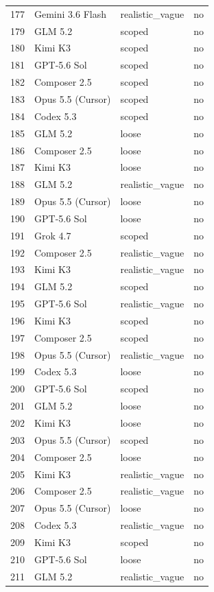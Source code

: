 \begin{tabular}{llll}
177 & Gemini 3.6 Flash & realistic\_vague & no \\
179 & GLM 5.2 & scoped & no \\
180 & Kimi K3 & scoped & no \\
181 & GPT-5.6 Sol & scoped & no \\
182 & Composer 2.5 & scoped & no \\
183 & Opus 5.5 (Cursor) & scoped & no \\
184 & Codex 5.3 & scoped & no \\
185 & GLM 5.2 & loose & no \\
186 & Composer 2.5 & loose & no \\
187 & Kimi K3 & loose & no \\
188 & GLM 5.2 & realistic\_vague & no \\
189 & Opus 5.5 (Cursor) & loose & no \\
190 & GPT-5.6 Sol & loose & no \\
191 & Grok 4.7 & scoped & no \\
192 & Composer 2.5 & realistic\_vague & no \\
193 & Kimi K3 & realistic\_vague & no \\
194 & GLM 5.2 & scoped & no \\
195 & GPT-5.6 Sol & realistic\_vague & no \\
196 & Kimi K3 & scoped & no \\
197 & Composer 2.5 & scoped & no \\
198 & Opus 5.5 (Cursor) & realistic\_vague & no \\
199 & Codex 5.3 & loose & no \\
200 & GPT-5.6 Sol & scoped & no \\
201 & GLM 5.2 & loose & no \\
202 & Kimi K3 & loose & no \\
203 & Opus 5.5 (Cursor) & scoped & no \\
204 & Composer 2.5 & loose & no \\
205 & Kimi K3 & realistic\_vague & no \\
206 & Composer 2.5 & realistic\_vague & no \\
207 & Opus 5.5 (Cursor) & loose & no \\
208 & Codex 5.3 & realistic\_vague & no \\
209 & Kimi K3 & scoped & no \\
210 & GPT-5.6 Sol & loose & no \\
211 & GLM 5.2 & realistic\_vague & no \\

\end{tabular}
